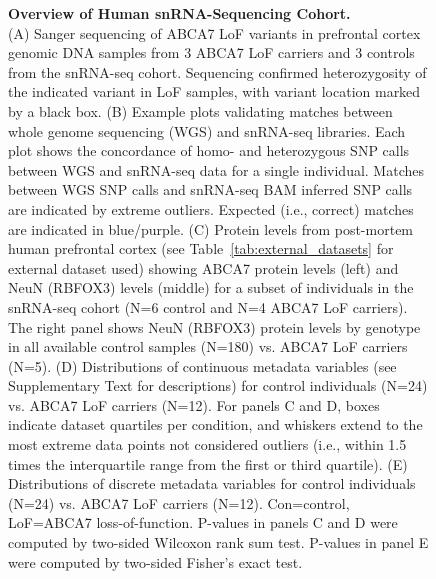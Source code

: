 \begin{figure}[ht]
\begin{subfigure}[t]{\textwidth}
    \end{subfigure}  
    \caption{
        \textbf{Overview of Human snRNA-Sequencing Cohort.}\\[1ex]
        (A) Sanger sequencing of ABCA7 LoF variants in prefrontal cortex genomic DNA samples from 3 ABCA7 LoF carriers and 3 controls from the snRNA-seq cohort. Sequencing confirmed heterozygosity of the indicated variant in LoF samples, with variant location marked by a black box. 
        (B) Example plots validating matches between whole genome sequencing (WGS) and snRNA-seq libraries. Each plot shows the concordance of homo- and heterozygous SNP calls between WGS and snRNA-seq data for a single individual. Matches between WGS SNP calls and snRNA-seq BAM inferred SNP calls are indicated by extreme outliers. Expected (i.e., correct) matches are indicated in blue/purple. 
        (C) Protein levels from post-mortem human prefrontal cortex (see Table~\ref{tab:external_datasets} for external dataset used) showing ABCA7 protein levels (left) and NeuN (RBFOX3) levels (middle) for a subset of individuals in the snRNA-seq cohort (N=6 control and N=4 ABCA7 LoF carriers). The right panel shows NeuN (RBFOX3) protein levels by genotype in all available control samples (N=180) vs. ABCA7 LoF carriers (N=5). 
        (D) Distributions of continuous metadata variables (see Supplementary Text for descriptions) for control individuals (N=24) vs. ABCA7 LoF carriers (N=12). For panels C and D, boxes indicate dataset quartiles per condition, and whiskers extend to the most extreme data points not considered outliers (i.e., within 1.5 times the interquartile range from the first or third quartile). 
        (E) Distributions of discrete metadata variables for control individuals (N=24) vs. ABCA7 LoF carriers (N=12). Con=control, LoF=ABCA7 loss-of-function. P-values in panels C and D were computed by two-sided Wilcoxon rank sum test. P-values in panel E were computed by two-sided Fisher’s exact test.
    }
    \label{fig:snRNA_cohort}
\end{figure}